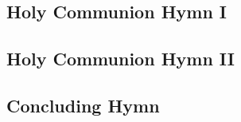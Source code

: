 \documentclass[12pt]{article}
\begin{document}
\begin{center}
\subsection*{Holy Communion Hymn I}
\end{center}
\begin{multicols}{2}
\communionhymnone
\end{multicols}
\begin{center}
\subsection*{Holy Communion Hymn II}
\end{center}
\begin{multicols}{2}
\communionhymntwo
\end{multicols}

\begin{center}
\subsection*{Concluding Hymn}
\end{center}
\begin{multicols}{2}
\concludinghymn
\end{multicols}
\end{document}
